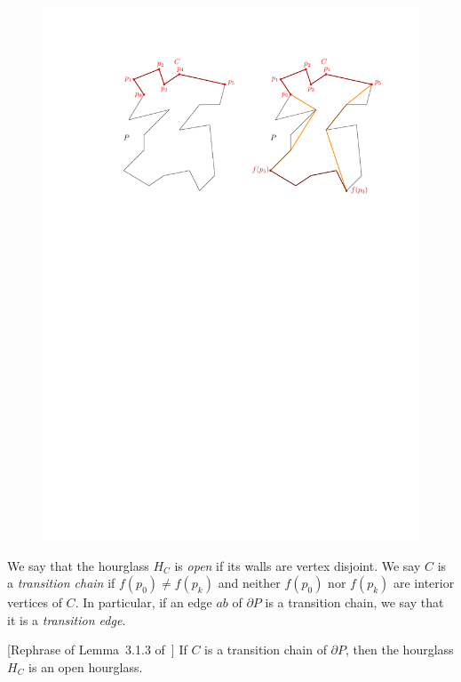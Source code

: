 \documentclass[a4paper,UKenglish]{lipics}
\newcommand{\ff}[1]{\ensuremath{f(#1)}}
\begin{document}
\begin{figure}[tb]
\centering
\includegraphics[width=1\textwidth]{img/TransitionChains.pdf}
\caption{\small }
\label{fig:Transition chains and hourglasses}
\end{figure}

We say that the hourglass $H_C$ is \emph{open} if its walls are vertex disjoint. 
We say $C$ is a \emph{transition chain} if $\ff{p_0} \neq \ff{p_k}$ and neither $\ff{p_0}$ nor $\ff{p_k}$ are interior vertices of $C$. In particular, if an edge $ab$ of $\partial P$ is a transition chain, we say that it is a \emph{transition edge}.

\begin{lemma}\label{lemma:Transition hourglasses are open}
[Rephrase of Lemma~3.1.3 of~\cite{aronov1993furthest}] 
If $C$ is a transition chain of $\partial P$, then the hourglass $H_C$ is an open hourglass.
\end{lemma}
\end{document}
